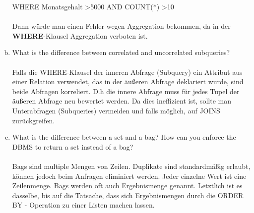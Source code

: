 \documentclass[11pt,a4paper,DIV=9]{scrartcl}
\begin{document}
\begin{enumerate}[a.]
WHERE Monatsgehalt \textgreater 5000 AND COUNT(*) \textgreater 10 \\\\
Dann w\"urde man einen Fehler wegen Aggregation bekommen, da in der \textbf{WHERE}-Klausel Aggregation verboten ist. \\
\item What is the difference between correlated and uncorrelated subqueries? \hfill\\\\
Falls die WHERE-Klausel der inneren Abfrage (Subquery) ein Attribut aus einer Relation verwendet, das in der \"au{\ss}eren Abfrage deklariert wurde, sind beide Abfragen korreliert. D.h die innere Abfrage muss f\"ur jedes Tupel der \"au{\ss}eren Abfrage neu bewertet werden. Da dies ineffizient ist, sollte man Unterabfragen (Subqueries) vermeiden und falls m\"oglich, auf JOINS zur\"uckgreifen. \\
\item What is the difference between a set and a bag? How can you enforce the DBMS to return a set instead of a bag? \\\\
Bags sind multiple Mengen von Zeilen. Duplikate sind standardm\"a{\ss}ig erlaubt, k\"onnen jedoch beim Anfragen eliminiert werden. Jeder einzelne Wert ist eine Zeilenmenge. Bags werden oft auch Ergebnismenge genannt. Letztlich ist es dasselbe, bis auf die Tatsache, dass sich Ergebnismengen durch die ORDER BY - Operation zu einer Listen machen lassen.

 \end{enumerate}
\end{document}
